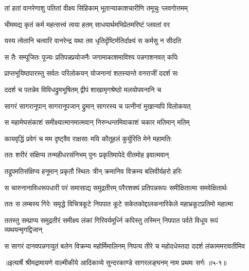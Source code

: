 \twolineshloka
{तां हतां वानरेणाशु पतितां वीक्ष्य सिंहिकाम्}
{भूतान्याकाशचारीणि तमूचुः प्लवगोत्तमम्} %

\twolineshloka
{भीममद्य कृतं कर्म महत्सत्त्वं त्वया हतम्}
{साधयार्थमभिप्रेतमरिष्टं प्लवतां वर} %

\twolineshloka
{यस्य त्वेतानि चत्वारि वानरेन्द्र यथा तव}
{धृतिर्दृष्टिर्मतिर्दाक्ष्यं स कर्मसु न सीदति} %

\twolineshloka
{स तैः सम्पूजितः पूज्यः प्रतिपन्नप्रयोजनैः}
{जगामाकाशमाविश्य पन्नगाशनवत् कपिः} %

\twolineshloka
{प्राप्तभूयिष्ठपारस्तु सर्वतः परिलोकयन्}
{योजनानां शतस्यान्ते वनराजीं ददर्श सः} %

\twolineshloka
{ददर्श च पतन्नेव विविधद्रुमभूषितम्}
{द्वीपं शाखामृगश्रेष्ठो मलयोपवनानि च} %

\twolineshloka
{सागरं सागरानूपान् सागरानूपजान् द्रुमान्}
{सागरस्य च पत्नीनां मुखान्यपि विलोकयत्} %

\twolineshloka
{स महामेघसंकाशं समीक्ष्यात्मानमात्मवान्}
{निरुन्धन्तमिवाकाशं चकार मतिमान् मतिम्} %

\twolineshloka
{कायवृद्धिं प्रवेगं च मम दृष्ट्वैव राक्षसाः}
{मयि कौतूहलं कुर्युरिति मेने महामतिः} %

\twolineshloka
{ततः शरीरं संक्षिप्य तन्महीधरसंनिभम्}
{पुनः प्रकृतिमापेदे वीतमोह इवात्मवान्} %

\twolineshloka
{तद्रूपमतिसंक्षिप्य हनूमान् प्रकृतौ स्थितः}
{त्रीन् क्रमानिव विक्रम्य बलिवीर्यहरो हरिः} %

\twolineshloka
{स चारुनानाविधरूपधारी परं समासाद्य समुद्रतीरम्}
{परैरशक्यं प्रतिपन्नरूपः समीक्षितात्मा समवेक्षितार्थः} %

\twolineshloka
{ततः स लम्बस्य गिरेः समृद्धे विचित्रकूटे निपपात कूटे}
{सकेतकोद्दालकनारिकेले महाभ्रकूटप्रतिमो महात्मा} %

\twolineshloka
{ततस्तु सम्प्राप्य समुद्रतीरं समीक्ष्य लंकां गिरिवर्यमूर्ध्नि}
{कपिस्तु तस्मिन् निपपात पर्वते विधूय रूपं व्यथयन्मृगद्विजान्} %

\twolineshloka
{स सागरं दानवपन्नगायुतं बलेन विक्रम्य महोर्मिमालिनम्}
{निपत्य तीरे च महोदधेस्तदा ददर्श लंकाममरावतीमिव} %


॥इत्यार्षे श्रीमद्रामायणे वाल्मीकीये आदिकाव्ये सुन्दरकाण्डे सागरलङ्घनम् नाम प्रथमः सर्गः ॥५-१॥
